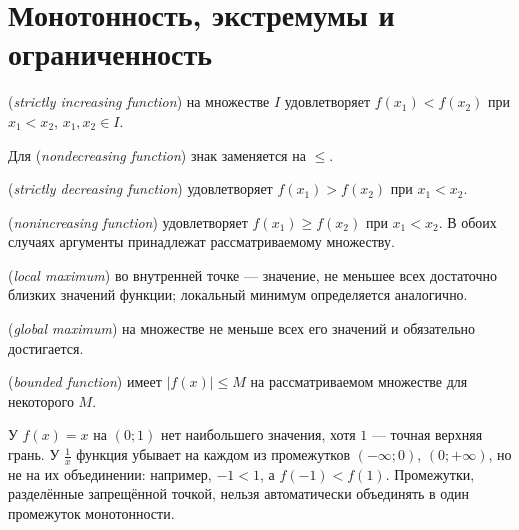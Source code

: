 \section{Монотонность, экстремумы и ограниченность}
\begin{definition} (\emph{strictly increasing function}) на множестве \(I\) удовлетворяет \(f(x_1)<f(x_2)\) при \(x_1<x_2\), \(x_1,x_2\in I\). \par Для  (\emph{nondecreasing function}) знак заменяется на \(\le\). \par{} (\emph{strictly decreasing function}) удовлетворяет \(f(x_1)>f(x_2)\) при \(x_1<x_2\). \par{} (\emph{nonincreasing function}) удовлетворяет \(f(x_1)\geq f(x_2)\) при \(x_1<x_2\). В обоих случаях аргументы принадлежат рассматриваемому множеству.\end{definition}
\begin{definition} (\emph{local maximum}) во внутренней точке --- значение, не меньшее всех достаточно близких значений функции; локальный минимум определяется аналогично. \par{} (\emph{global maximum}) на множестве не меньше всех его значений и обязательно достигается. \par{} (\emph{bounded function}) имеет \(|f(x)|\le M\) на рассматриваемом множестве для некоторого \(M\).\end{definition}
У \(f(x)=x\) на \((0;1)\) нет наибольшего значения, хотя \(1\) --- точная верхняя грань. У \(\frac{1}{x}\) функция убывает на каждом из промежутков \(( -\infty;0)\), \((0;+\infty)\), но не на их объединении: например, \(-1<1\), а \(f(-1)<f(1)\). Промежутки, разделённые запрещённой точкой, нельзя автоматически объединять в один промежуток монотонности.
